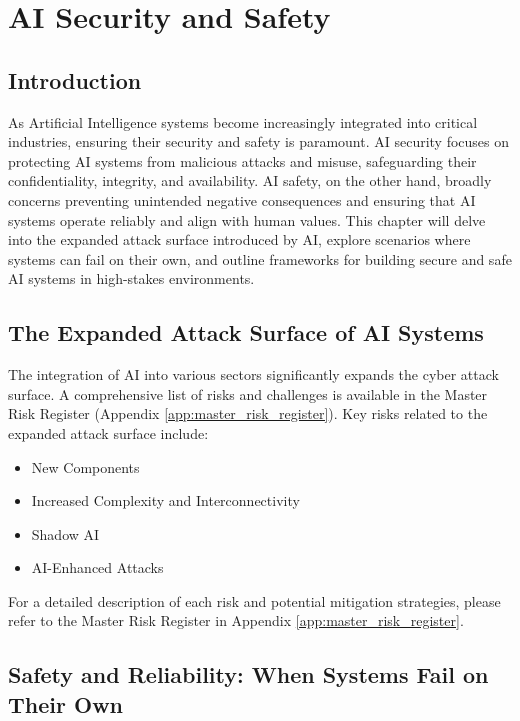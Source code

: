 \chapter{AI Security and Safety}
\label{chap:ai_security_and_safety}

\section{Introduction}
\label{sec:security_introduction}
As Artificial Intelligence systems become increasingly integrated into critical industries, ensuring their security and safety is paramount. AI security focuses on protecting AI systems from malicious attacks and misuse, safeguarding their confidentiality, integrity, and availability. AI safety, on the other hand, broadly concerns preventing unintended negative consequences and ensuring that AI systems operate reliably and align with human values. This chapter will delve into the expanded attack surface introduced by AI, explore scenarios where systems can fail on their own, and outline frameworks for building secure and safe AI systems in high-stakes environments.

\section{The Expanded Attack Surface of AI Systems}
\label{sec:attack_surface}

The integration of AI into various sectors significantly expands the cyber attack surface. A comprehensive list of risks and challenges is available in the Master Risk Register (Appendix \ref{app:master_risk_register}). Key risks related to the expanded attack surface include:

\begin{itemize}
    \item New Components
    \item Increased Complexity and Interconnectivity
    \item Shadow AI
    \item AI-Enhanced Attacks
\end{itemize}

For a detailed description of each risk and potential mitigation strategies, please refer to the Master Risk Register in Appendix \ref{app:master_risk_register}.

\section{Safety and Reliability: When Systems Fail on Their Own}
\label{sec:safety_and_reliability}

